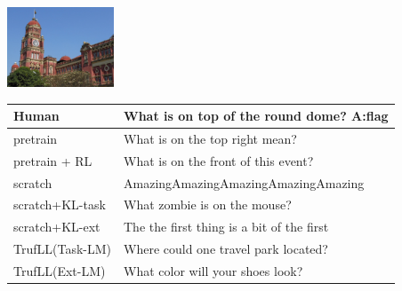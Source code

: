 \documentclass{article}
\newcommand{\algo}{TrufLL\xspace}
\begin{document}
\begin{table}[t!]
    \begin{minipage}{0.2\linewidth}
        \includegraphics[width=120px]{./COCO_val2014_000000148403.jpeg}
	\end{minipage}
	\hspace{1.2cm}
	\begin{minipage}{0.80\linewidth}
		\scriptsize
		\begin{tabular}{ll}
			Human           & What is on top of the round dome?  \quad \textbf{A:flag} \\
			\midrule
			pretrain        & What is on the top right mean? \\
		    pretrain + RL   & What is on the front of this event? \\ \midrule
			scratch         & AmazingAmazingAmazingAmazingAmazing  \\
			scratch+KL-task & What zombie is on the mouse? \\
			scratch+KL-ext  & The the first thing is a bit of the first\\ \midrule
			\algo(Task-LM) & Where could one travel park located? \\
			\algo(Ext-LM)   & What color will your shoes look? \\
			\bottomrule
		\end{tabular}
	\end{minipage}
	\vspace{1mm}


\end{table}
\end{document}
